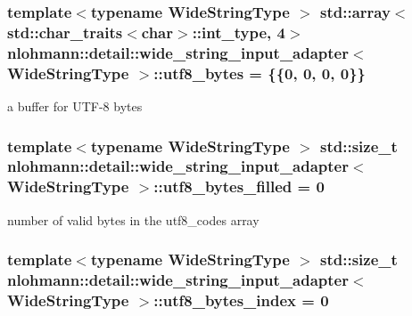 \subsubsection[{\texorpdfstring{utf8\+\_\+bytes}{utf8_bytes}}]{\setlength{\rightskip}{0pt plus 5cm}template$<$typename Wide\+String\+Type $>$ {\bf std\+::array}$<$std\+::char\+\_\+traits$<$char$>$\+::int\+\_\+type, 4$>$ {\bf nlohmann\+::detail\+::wide\+\_\+string\+\_\+input\+\_\+adapter}$<$ Wide\+String\+Type $>$\+::utf8\+\_\+bytes = \{\{0, 0, 0, 0\}\}\hspace{0.3cm}{\ttfamily [private]}}\hypertarget{classnlohmann_1_1detail_1_1wide__string__input__adapter_af0854ae66725357d074912379a235128}{}\label{classnlohmann_1_1detail_1_1wide__string__input__adapter_af0854ae66725357d074912379a235128}


a buffer for U\+T\+F-\/8 bytes 

\subsubsection[{\texorpdfstring{utf8\+\_\+bytes\+\_\+filled}{utf8_bytes_filled}}]{\setlength{\rightskip}{0pt plus 5cm}template$<$typename Wide\+String\+Type $>$ std\+::size\+\_\+t {\bf nlohmann\+::detail\+::wide\+\_\+string\+\_\+input\+\_\+adapter}$<$ Wide\+String\+Type $>$\+::utf8\+\_\+bytes\+\_\+filled = 0\hspace{0.3cm}{\ttfamily [private]}}\hypertarget{classnlohmann_1_1detail_1_1wide__string__input__adapter_a9fc33bf0974526336e53ea530c7097ff}{}\label{classnlohmann_1_1detail_1_1wide__string__input__adapter_a9fc33bf0974526336e53ea530c7097ff}


number of valid bytes in the utf8\+\_\+codes array 

\subsubsection[{\texorpdfstring{utf8\+\_\+bytes\+\_\+index}{utf8_bytes_index}}]{\setlength{\rightskip}{0pt plus 5cm}template$<$typename Wide\+String\+Type $>$ std\+::size\+\_\+t {\bf nlohmann\+::detail\+::wide\+\_\+string\+\_\+input\+\_\+adapter}$<$ Wide\+String\+Type $>$\+::utf8\+\_\+bytes\+\_\+index = 0\hspace{0.3cm}{\ttfamily [private]}}\hypertarget{classnlohmann_1_1detail_1_1wide__string__input__adapter_a6d87bc3e8b427e06cda936383283e0c4}{}\label{classnlohmann_1_1detail_1_1wide__string__input__adapter_a6d87bc3e8b427e06cda936383283e0c4}


